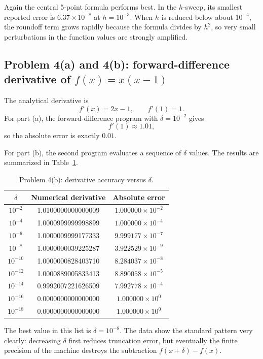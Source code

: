 \documentclass[12pt,a4paper]{article}
\begin{document}
Again the central 5-point formula performs best. In the $h$-sweep, its smallest reported error is $6.37\times 10^{-8}$ at $h=10^{-3}$. When $h$ is reduced below about $10^{-4}$, the roundoff term grows rapidly because the formula divides by $h^2$, so very small perturbations in the function values are strongly amplified.

\subsection{Problem 4(a) and 4(b): forward-difference derivative of $f(x)=x(x-1)$}

The analytical derivative is
\[
f'(x)=2x-1,
\qquad
f'(1)=1.
\]
For part (a), the forward-difference program with $\delta=10^{-2}$ gives
\[
f'(1)\approx 1.01,
\]
so the absolute error is exactly $0.01$.

For part (b), the second program evaluates a sequence of $\delta$ values. The results are summarized in Table~\ref{tab:p4b}.

\begin{table}[H]
\centering
\caption{Problem 4(b): derivative accuracy versus $\delta$.}
\label{tab:p4b}
\begin{tabular}{ccc}
\toprule
$\delta$ & Numerical derivative & Absolute error \\
\midrule
$10^{-2}$ & 1.0100000000000009 & $1.000000\times 10^{-2}$ \\
$10^{-4}$ & 1.0000999999998899 & $1.000000\times 10^{-4}$ \\
$10^{-6}$ & 1.0000009999177333 & $9.999177\times 10^{-7}$ \\
$10^{-8}$ & 1.0000000039225287 & $3.922529\times 10^{-9}$ \\
$10^{-10}$ & 1.0000000828403710 & $8.284037\times 10^{-8}$ \\
$10^{-12}$ & 1.0000889005833413 & $8.890058\times 10^{-5}$ \\
$10^{-14}$ & 0.9992007221626509 & $7.992778\times 10^{-4}$ \\
$10^{-16}$ & 0.0000000000000000 & $1.000000\times 10^{0}$ \\
$10^{-18}$ & 0.0000000000000000 & $1.000000\times 10^{0}$ \\
\bottomrule
\end{tabular}
\end{table}

The best value in this list is $\delta=10^{-8}$. The data show the standard pattern very clearly: decreasing $\delta$ first reduces truncation error, but eventually the finite precision of the machine destroys the subtraction $f(x+\delta)-f(x)$.
\end{document}
